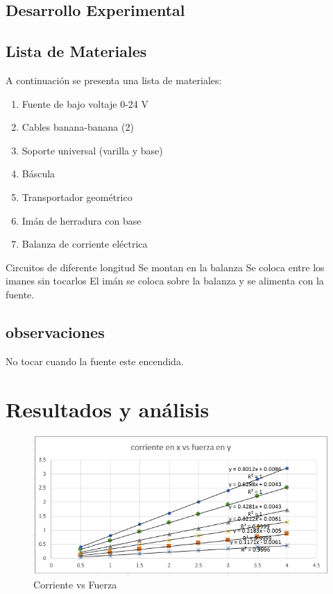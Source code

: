 \documentclass{article}
\begin{document}
\begin{multicols}{2}
\section{Desarrollo Experimental}\label{Desarrollo experimental}				%
\subsection*{Lista de Materiales}
A continuación se presenta una lista de materiales:
\begin{enumerate}
    \item Fuente de bajo voltaje 0-24 V
    \item Cables banana-banana (2)
    \item Soporte universal (varilla y base)
    \item Báscula 
    \item Transportador geométrico 
    \item Imán de herradura con base 
    \item Balanza de corriente eléctrica 
\end{enumerate}
Circuitos de diferente longitud
Se montan en la balanza
Se coloca entre los imanes sin tocarlos
El imán se coloca sobre la balanza y se alimenta
con la fuente.
\subsection*{observaciones}
No tocar cuando la fuente este encendida.
\end{multicols}
\section{Resultados y análisis}\label{Resultados}			%

\begin{figure}[H]
   \centering
   \includegraphics[scale=0.6]{../imgs/o.png}
   \caption{Corriente vs Fuerza}
   \label{Fig:1}
\end{figure}
\end{document}
